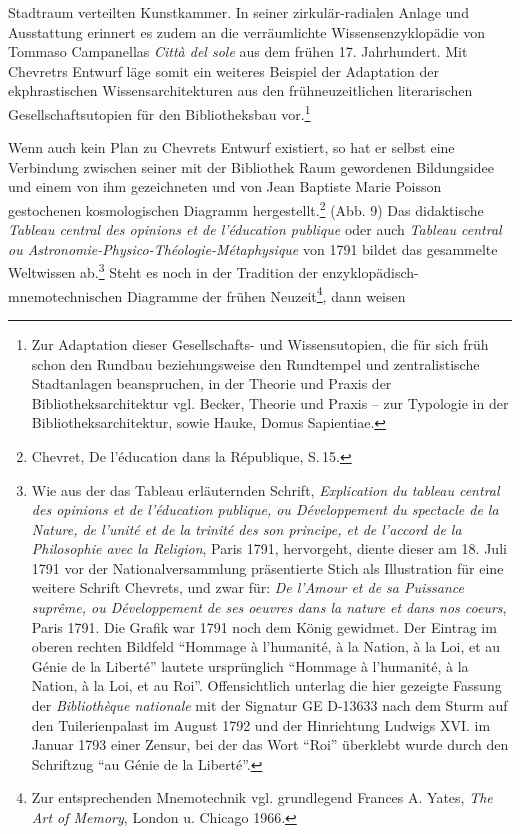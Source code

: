 Stadtraum verteilten Kunstkammer. In seiner zirkulär-radialen Anlage und
Ausstattung erinnert es zudem an die verräumlichte Wissensenzyklopädie
von Tommaso Campanellas \emph{Città del sole} aus dem frühen 17.
Jahrhundert. Mit Chevretrs Entwurf läge somit ein weiteres Beispiel der
Adaptation der ekphrastischen Wissensarchitekturen aus den
frühneuzeitlichen literarischen Gesellschaftsutopien für den
Bibliotheksbau vor.\footnote{Zur Adaptation dieser Gesellschafts- und
  Wissensutopien, die für sich früh schon den Rundbau beziehungsweise den
  Rundtempel und zentralistische Stadtanlagen beanspruchen, in der
  Theorie und Praxis der Bibliotheksarchitektur vgl. Becker, Theorie und
  Praxis -- zur Typologie in der Bibliotheksarchitektur, sowie Hauke,
  Domus Sapientiae.}

Wenn auch kein Plan zu Chevrets Entwurf existiert, so hat er selbst eine
Verbindung zwischen seiner mit der Bibliothek Raum gewordenen
Bildungsidee und einem von ihm gezeichneten und von Jean Baptiste Marie
Poisson gestochenen kosmologischen Diagramm hergestellt.\footnote{Chevret,
  De l'éducation dans la République, S.\,15.} (Abb. 9) Das didaktische
\emph{Tableau central des opinions et de l'éducation publique} oder auch
\emph{Tableau central ou Astronomie-Physico-Théologie-Métaphysique} von
1791 bildet das gesammelte Weltwissen ab.\footnote{Wie aus der das
  Tableau erläuternden Schrift, \emph{Explication du tableau central des
  opinions et de l'éducation publique, ou Développement du spectacle de
  la Nature, de l'unité et de la trinité des son principe, et de
  l'accord de la Philosophie avec la Religion}, Paris 1791, hervorgeht,
  diente dieser am 18. Juli 1791 vor der Nationalversammlung
  präsentierte Stich als Illustration für eine weitere Schrift Chevrets,
  und zwar für: \emph{De l'Amour et de sa Puissance suprême, ou
  Développement de ses oeuvres dans la nature et dans nos coeurs}, Paris
  1791. Die Grafik war 1791 noch dem König gewidmet. Der Eintrag im
  oberen rechten Bildfeld \enquote{Hommage à l'humanité, à la Nation, à
  la Loi, et au Génie de la Liberté} lautete ursprünglich
  \enquote{Hommage à l'humanité, à la Nation, à la Loi, et au Roi}.
  Offensichtlich unterlag die hier gezeigte Fassung der
  \emph{Bibliothèque nationale} mit der Signatur GE D-13633 nach dem
  Sturm auf den Tuilerienpalast im August 1792 und der Hinrichtung
  Ludwigs XVI. im Januar 1793 einer Zensur, bei der das Wort
  \enquote{Roi} überklebt wurde durch den Schriftzug \enquote{au Génie
  de la Liberté}.} Steht es noch in der Tradition der
enzyklopädisch-mnemotechnischen Diagramme der frühen Neuzeit\footnote{Zur
  entsprechenden Mnemotechnik vgl. grundlegend Frances A. Yates,
  \emph{The Art of Memory}, London u. Chicago 1966.}, dann weisen
